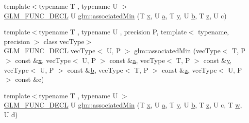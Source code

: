 \begin{DoxyCompactItemize}
\item 
{\footnotesize template$<$typename T , typename U $>$ }\\\mbox{\hyperlink{setup_8hpp_ab2d052de21a70539923e9bcbf6e83a51}{G\+L\+M\+\_\+\+F\+U\+N\+C\+\_\+\+D\+E\+CL}} U \mbox{\hyperlink{group__gtx__associated__min__max_gad0aa8f86259a26d839d34a3577a923fc}{glm\+::associated\+Min}} (T \mbox{\hyperlink{glad_8h_a92d0386e5c19fb81ea88c9f99644ab1d}{x}}, U \mbox{\hyperlink{glad_8h_ac8729153468b5dcf13f971b21d84d4e5}{a}}, T \mbox{\hyperlink{glad_8h_a66ddd433d2cacfe27f5906b7e86faeed}{y}}, U \mbox{\hyperlink{glad_8h_a6eba317e3cf44d6d26c04a5a8f197dcb}{b}}, T \mbox{\hyperlink{glad_8h_acb78bf1972d3eaf07da34ff2e0a2f133}{z}}, U c)
\item 
{\footnotesize template$<$typename T , typename U , precision P, template$<$ typename, precision $>$ class vec\+Type$>$ }\\\mbox{\hyperlink{setup_8hpp_ab2d052de21a70539923e9bcbf6e83a51}{G\+L\+M\+\_\+\+F\+U\+N\+C\+\_\+\+D\+E\+CL}} vec\+Type$<$ U, P $>$ \mbox{\hyperlink{group__gtx__associated__min__max_ga5bc6b9acbf9e060d58a342fbe3b73d43}{glm\+::associated\+Min}} (vec\+Type$<$ T, P $>$ const \&\mbox{\hyperlink{glad_8h_a92d0386e5c19fb81ea88c9f99644ab1d}{x}}, vec\+Type$<$ U, P $>$ const \&\mbox{\hyperlink{glad_8h_ac8729153468b5dcf13f971b21d84d4e5}{a}}, vec\+Type$<$ T, P $>$ const \&\mbox{\hyperlink{glad_8h_a66ddd433d2cacfe27f5906b7e86faeed}{y}}, vec\+Type$<$ U, P $>$ const \&\mbox{\hyperlink{glad_8h_a6eba317e3cf44d6d26c04a5a8f197dcb}{b}}, vec\+Type$<$ T, P $>$ const \&\mbox{\hyperlink{glad_8h_acb78bf1972d3eaf07da34ff2e0a2f133}{z}}, vec\+Type$<$ U, P $>$ const \&c)
\item 
{\footnotesize template$<$typename T , typename U $>$ }\\\mbox{\hyperlink{setup_8hpp_ab2d052de21a70539923e9bcbf6e83a51}{G\+L\+M\+\_\+\+F\+U\+N\+C\+\_\+\+D\+E\+CL}} U \mbox{\hyperlink{group__gtx__associated__min__max_ga432224ebe2085eaa2b63a077ecbbbff6}{glm\+::associated\+Min}} (T \mbox{\hyperlink{glad_8h_a92d0386e5c19fb81ea88c9f99644ab1d}{x}}, U \mbox{\hyperlink{glad_8h_ac8729153468b5dcf13f971b21d84d4e5}{a}}, T \mbox{\hyperlink{glad_8h_a66ddd433d2cacfe27f5906b7e86faeed}{y}}, U \mbox{\hyperlink{glad_8h_a6eba317e3cf44d6d26c04a5a8f197dcb}{b}}, T \mbox{\hyperlink{glad_8h_acb78bf1972d3eaf07da34ff2e0a2f133}{z}}, U c, T \mbox{\hyperlink{glad_8h_a1d0296e9e835f2e1ee17634af95fc1ec}{w}}, U d)
\item 

\end{DoxyCompactItemize}
